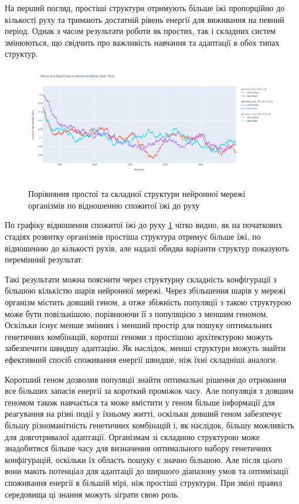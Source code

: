 На перший погляд, простіші структури отримують більше їжі 
пропорційно до кількості руху та тримають достатній рівень
енергії для виживання на певний період. 
Однак з часом результати роботи як простих, 
так і складних систем змінюються, що 
свідчить про важливість навчання та адаптації в обох типах структур.

\begin{figure}[ht]
  \centering
  \caption{Порівняння простої та складної структури нейронної мережі організмів по відношенню спожитої їжі до руху}
  \includegraphics[scale=0.3]{Images/comparing-genomes-food-to-movement-complex-is-leader.png}
  \label{fig:порівняння-простої-та-складної-структури-нейронної-мережі-організмів-по-відношенню-спожитої-їжі-до-руху}
\end{figure}

По графіку відношення спожитої їжі до руху
\ref{fig:порівняння-простої-та-складної-структури-нейронної-мережі-організмів-по-відношенню-спожитої-їжі-до-руху}
чітко видно, як на початкових стадіях розвитку організмів
простіша структура отримує більше їжі, по відношенню до кількості рухів,
але надалі обидва варіанти структур показують перемінний результат.

Такі результати можна пояснити через структурну складність 
конфігурації з більшою кількістю шарів нейронної мережі. 
Через збільшення шарів у мережі організм містить довший геном, 
а отже збіжність популяції з такою структурою може бути повільнішою, 
порівнюючи її з популяцією з меншим геномом.
Оскільки існує менше змінних і менший простір для 
пошуку оптимальних генетичних комбінацій, 
коротші геноми з простішою архітектурою можуть забезпечити 
швидшу адаптацію. 
Як наслідок, менші структури можуть знайти ефективний 
спосіб споживання енергії швидше, ніж їхні складніші аналоги.

Коротший геном дозволив популяції знайти оптимальні рішення 
до отримання все більших запасів енергії за короткий проміжок часу. 
Але популяція з довшим геномом також навчається та 
може вмістити у геном більше інформації для реагування 
на різні події у їхньому житті,
оскільки довший геном забезпечує більшу
різноманітність генетичних комбінацій і, 
як наслідок, більшу можливість для довготривалої адаптації. 
Організмам зі складною структурою може знадобитися більше часу для 
визначення оптимального набору генетичних конфігурацій,
оскільки їх область пошуку є значно більшою. 
Але після цього вони мають потенціал для адаптації до ширшого діапазону 
умов та оптимізації споживання енергії в більшій мірі, ніж простіші структури.
При зміні правил середовища ці знання можуть зіграти свою роль.



